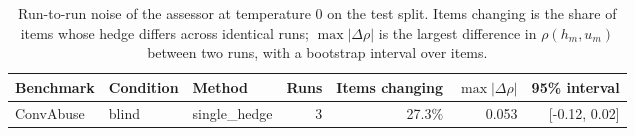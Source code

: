 \begin{table}[t]
\centering
\small
\begin{tabular}{lllrrrr}
\hline
Benchmark & Condition & Method & Runs & Items changing & $\max|\Delta\rho|$ & 95\% interval \\
\hline
ConvAbuse & blind & single\_hedge & 3 & 27.3\% & 0.053 & [-0.12, 0.02] \\
\hline
\end{tabular}
\caption{Run-to-run noise of the assessor at temperature 0 on the test split. Items changing is the share of items whose hedge differs across identical runs; $\max|\Delta\rho|$ is the largest difference in $\rho(h_m,u_m)$ between two runs, with a bootstrap interval over items.}
\label{tab:floor}
\end{table}